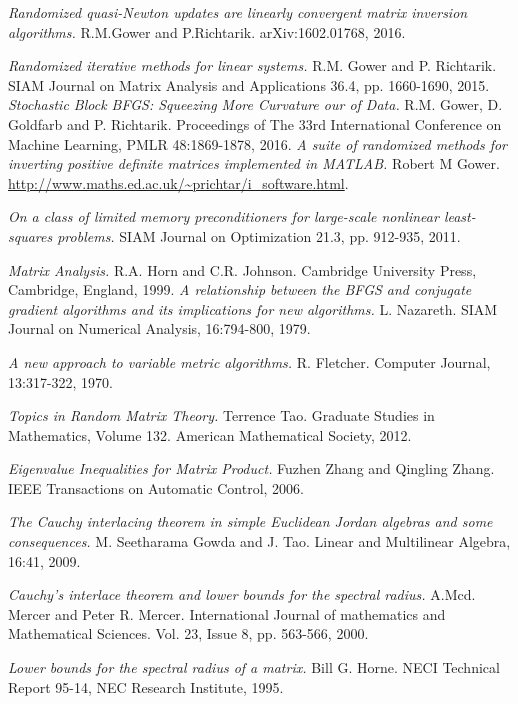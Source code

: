 \documentclass[12pt,conference,compsocconf]{IEEEtran}
\begin{document}
\begin{thebibliography}{1}

\textit{Randomized quasi-Newton updates are linearly convergent matrix inversion algorithms.}
R.M.Gower and P.Richtarik. arXiv:1602.01768, 2016.

\textit{Randomized iterative methods for linear systems.} R.M. Gower and P. Richtarik. SIAM Journal on Matrix Analysis and Applications 36.4, pp. 1660-1690, 2015.
\textit{Stochastic Block BFGS: Squeezing More Curvature our of Data.} R.M. Gower, D. Goldfarb and P. Richtarik. Proceedings of The 33rd International Conference on Machine Learning, PMLR 48:1869-1878, 2016.
\textit{A suite of randomized methods for inverting positive definite matrices implemented in MATLAB.} Robert M Gower. \url{http://www.maths.ed.ac.uk/~prichtar/i_software.html}.

\textit{On a class of limited memory preconditioners for large-scale nonlinear least-squares problems.} SIAM Journal on Optimization 21.3, pp. 912-935, 2011.

\textit{Matrix Analysis.} R.A. Horn and C.R. Johnson. Cambridge University Press, Cambridge, England, 1999.
\textit{A relationship between the BFGS and conjugate gradient algorithms and its implications for new algorithms.} L. Nazareth. SIAM Journal on Numerical Analysis, 16:794-800, 1979.

\textit{A new approach to variable metric algorithms.} R. Fletcher. Computer Journal, 13:317-322, 1970.

\textit{Topics in Random Matrix Theory.} Terrence Tao. Graduate Studies in Mathematics, Volume 132. American Mathematical Society, 2012.

\textit{Eigenvalue Inequalities for Matrix Product.} Fuzhen Zhang and Qingling Zhang. IEEE Transactions on Automatic Control, 2006.

\textit{The Cauchy interlacing theorem in simple Euclidean Jordan algebras and some consequences.}
M. Seetharama Gowda and J. Tao. Linear and Multilinear Algebra, 16:41, 2009.

\textit{Cauchy's interlace theorem and lower bounds for the spectral radius.} A.Mcd. Mercer and Peter R. Mercer. International Journal of mathematics and Mathematical Sciences. Vol. 23, Issue 8, pp. 563-566, 2000.

\textit{Lower bounds for the spectral radius of a matrix.} Bill G. Horne. NECI Technical Report 95-14, NEC Research Institute, 1995.


\end{thebibliography}
\end{document}
